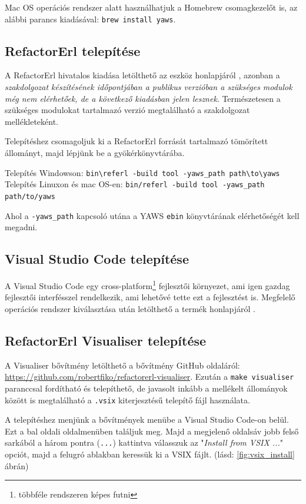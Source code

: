 Mac OS operációs rendszer alatt használhatjuk a Homebrew csomagkezelőt \cite{homebrew} is, az alábbi parancs kiadásával:
\noindent \lstinline{brew install yaws}.

\subsection{RefactorErl telepítése}
A RefactorErl hivatalos kiadása letölthető az eszköz honlapjáról \cite{refactorErlWebsite}, azonban a \textit{szakdolgozat készítésének időpontjában a publikus verzióban a szükséges modulok még nem elérhetőek, de a következő kiadásban jelen lesznek}. Természetesen a szükséges modulokat tartalmazó verzió megtalálható a szakdolgozat mellékleteként.

Telepítéshez csomagoljuk ki a RefactorErl forrását tartalmazó tömörített állományt, majd lépjünk be a gyökérkönyvtárába.

\noindent Telepítés Windowson: \lstinline{bin\referl -build tool -yaws_path path\to\yaws}
\noindent Telepítés Linuxon és mac OS-en: \lstinline{bin/referl -build tool -yaws_path path/to/yaws}

Ahol a \lstinline{-yaws_path} kapcsoló utána a YAWS \lstinline{ebin} könyvtárának elérhetőségét kell megadni. 

\subsection{Visual Studio Code telepítése}
A Visual Studio Code egy cross-platform\footnote{többféle rendszeren képes futni} fejlesztői környezet, ami igen gazdag fejlesztői interfésszel rendelkezik, ami lehetővé tette ezt a fejlesztést is. Megfelelő operációs rendszer kiválasztása után letölthető a termék honlapjáról \cite{vscodeWebsite}.

\subsection{RefactorErl Visualiser telepítése}
A Visualiser bővítmény letölthető a bővítmény GitHub oldaláról: \url{https://github.com/robertfiko/refactorerl-visualiser}. Ezután a \lstinline{make visualiser} paranccsal fordítható és telepíthető, de javasolt inkább a mellékelt állományok között is megtalálható a \lstinline{.vsix} kiterjesztésű telepítő fájl használata. 

A telepítéshez menjünk a bővítmények menübe a Visual Studio Code-on belül. Ezt a bal oldali oldalmenüben találjuk meg. Majd a megjelenő oldalsáv jobb felső sarkából a három pontra (\lstinline{...}) kattintva válasszuk az "\textit{Install from VSIX ...}" opciót, majd a felugró ablakban keressük ki a VSIX fájlt. (lásd: \ref{fig:vsix_install} ábrán)

